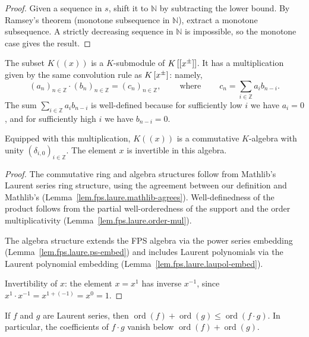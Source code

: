 \begin{proof}
\leanok
Given a sequence in $s$, shift it to $\mathbb{N}$ by subtracting the
lower bound. By Ramsey's theorem (monotone subsequence in $\mathbb{N}$),
extract a monotone subsequence. A strictly decreasing sequence in
$\mathbb{N}$ is impossible, so the monotone case gives the result.
\end{proof}

\begin{theorem}
\label{thm.fps.laure.lauser-ring}
\leantarget
\leanok
The subset $K\left(  \left(  x\right)  \right)  $
is a $K$-submodule of $K\left[  \left[  x^{\pm}\right]  \right]  $.
It has a multiplication given by the same convolution rule as
$K\left[  x^{\pm}\right]  $: namely,%
\[
\left(  a_{n}\right)  _{n\in\mathbb{Z}}\cdot\left(  b_{n}\right)
_{n\in\mathbb{Z}}=\left(  c_{n}\right)  _{n\in\mathbb{Z}}%
,\ \ \ \ \ \ \ \ \ \ \text{where}\ \ \ \ \ \ \ \ \ \ c_{n}=\sum_{i\in
\mathbb{Z}}a_{i}b_{n-i}.
\]
The sum $\sum_{i\in\mathbb{Z}}a_{i}b_{n-i}$ is well-defined because
for sufficiently low $i$ we have $a_i = 0$, and for sufficiently high $i$
we have $b_{n-i} = 0$.

Equipped with this multiplication, $K\left(
\left(  x\right)  \right)  $ is a commutative $K$-algebra with unity
$\left(  \delta_{i,0}\right)  _{i\in\mathbb{Z}}$.
The element $x$ is invertible in this algebra.
\end{theorem}

\begin{proof}
The commutative ring and algebra structures follow from Mathlib's
Laurent series ring structure, using the agreement between our definition
and Mathlib's (Lemma~\ref{lem.fps.laure.mathlib-agrees}).
Well-definedness of the product
follows from the partial well-orderedness of the support
and the order multiplicativity (Lemma~\ref{lem.fps.laure.order-mul}).

The algebra structure extends the FPS algebra via
the power series embedding (Lemma~\ref{lem.fps.laure.ps-embed}) and
includes Laurent polynomials via the Laurent polynomial embedding
(Lemma~\ref{lem.fps.laure.laupol-embed}).

Invertibility of $x$: the element $x = x^1$ has inverse
$x^{-1}$, since $x^1 \cdot x^{-1} = x^{1+(-1)} = x^0 = 1$.
\end{proof}

\begin{lemma}
\label{lem.fps.laure.order-mul}
\leanhelper
\leanok
If $f$ and $g$ are Laurent series, then
$\operatorname{ord}(f) + \operatorname{ord}(g) \le \operatorname{ord}(f \cdot g)$.
In particular, the coefficients of $f \cdot g$ vanish below
$\operatorname{ord}(f) + \operatorname{ord}(g)$.
\end{lemma}

